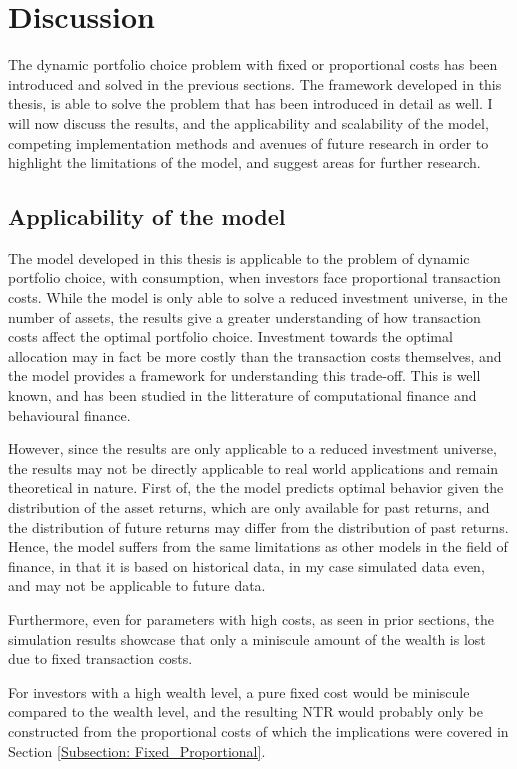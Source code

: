 \documentclass[11pt]{article}
\begin{document}
\fi
\section{Discussion} \label{Section: Discussion}
The dynamic portfolio choice problem with fixed or proportional costs has been introduced and solved in the previous sections.
The framework developed in this thesis, is able to solve the problem that has been introduced in detail as well.
I will now discuss the results, and the applicability and scalability of the model, competing implementation methods and avenues of future research
in order to highlight the limitations of the model, and suggest areas for further research.

\subsection{Applicability of the model} \label{Subsection: Applicability of the model}
The model developed in this thesis is applicable to the problem of dynamic portfolio choice, with consumption, when investors face proportional transaction costs.
While the model is only able to solve a reduced investment universe, in the number of assets, the
results give a greater understanding of how transaction costs affect the optimal portfolio choice.
Investment towards the optimal allocation may in fact be more costly than the transaction costs themselves, and the model provides a framework for understanding this trade-off.
This is well known, and has been studied in the litterature of computational finance and behavioural finance.

However, since the results are only applicable to a reduced investment universe, the results may not be directly applicable to real world applications
and remain theoretical in nature. 
First of, the the model predicts optimal behavior given the distribution of the asset returns,
which are only available for past returns, and the distribution of future returns may differ from the distribution of past returns.
Hence, the model suffers from the same limitations as other models in the field of finance, in that it is based on historical data,
in my case simulated data even, and may not be applicable to future data.

Furthermore, even for parameters with high costs, as seen in prior sections, the simulation results showcase that only a miniscule amount of the wealth is lost due to fixed transaction costs.

For investors with a high wealth level, a pure fixed cost would be miniscule compared to the wealth level,
and the resulting \ac{NTR} would probably only be constructed from the proportional costs of which the implications were covered in Section \ref{Subsection: Fixed_Proportional}.
\end{document}
